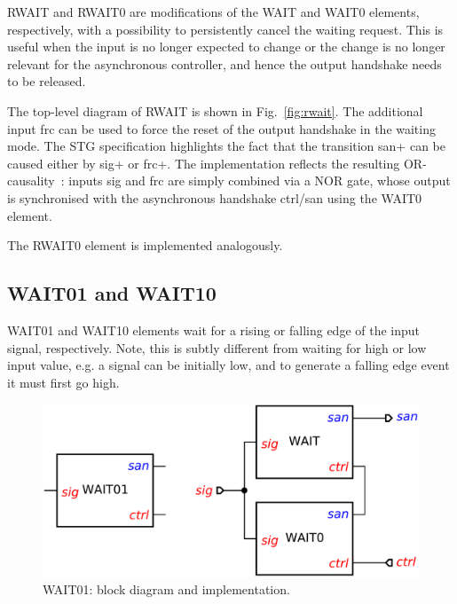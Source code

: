 \documentclass[conference]{IEEEtran}
\begin{document}
\textsf{RWAIT} and \textsf{RWAIT0} are modifications of the \textsf{WAIT} and \textsf{WAIT0}
elements, respectively, with a possibility to persistently cancel the waiting request. This
is useful when the input is no longer expected to change or the change is no longer relevant
for the asynchronous controller, and hence the output handshake needs to be released.

The top-level diagram of \textsf{RWAIT} is shown in Fig.~\ref{fig:rwait}. The additional input
\textsf{frc} can be used to force the reset of the output handshake in the waiting mode. The
STG specification highlights the fact that the transition \textsf{san+} can be caused either by
\textsf{sig+} or \textsf{frc+}. The implementation reflects the resulting
OR-causality~\cite{1996_yakovlev_or}: inputs \textsf{sig} and \textsf{frc} are simply combined
via a NOR gate, whose output is synchronised with the asynchronous handshake \textsf{ctrl/san}
using the \textsf{WAIT0} element.

The \textsf{RWAIT0} element is implemented analogously.

\subsection{\textsf{WAIT01} and \textsf{WAIT10}}

\textsf{WAIT01} and \textsf{WAIT10} elements wait for a rising or falling edge of the input
signal, respectively. Note, this is subtly different from waiting for high or low input value,
e.g. a signal can be initially low, and to generate a falling edge event it must first go high.

\begin{figure}
\begin{center}
    \includegraphics[scale=0.23]{fig/WAIT01.pdf}
    \caption{\textsf{WAIT01}: block diagram and implementation.}
    \label{fig:wait01}
\end{center}
\end{figure}
\end{document}
